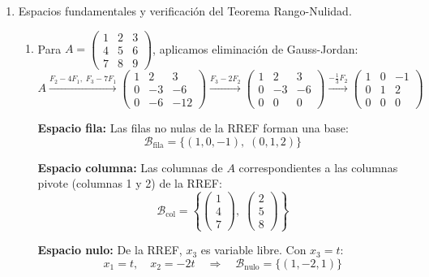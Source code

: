 \documentclass[12pt,letterpaper]{article}
\begin{document}
\begin{enumerate}


\item Espacios fundamentales y verificación del Teorema Rango-Nulidad.

\begin{enumerate}

    \item Para $A = \begin{pmatrix} 1 & 2 & 3 \\ 4 & 5 & 6 \\ 7 & 8 & 9 \end{pmatrix}$, aplicamos eliminación de Gauss-Jordan:
    \[
    A \xrightarrow{F_2-4F_1,\; F_3-7F_1}
    \begin{pmatrix} 1 & 2 & 3 \\ 0 & -3 & -6 \\ 0 & -6 & -12 \end{pmatrix}
    \xrightarrow{F_3-2F_2}
    \begin{pmatrix} 1 & 2 & 3 \\ 0 & -3 & -6 \\ 0 & 0 & 0 \end{pmatrix}
    \xrightarrow{-\frac{1}{3}F_2}
    \begin{pmatrix} 1 & 0 & -1 \\ 0 & 1 & 2 \\ 0 & 0 & 0 \end{pmatrix}
    \]

    \textbf{Espacio fila:} Las filas no nulas de la RREF forman una base:
    \[
    \mathcal{B}_{\text{fila}} = \{(1,0,-1),\; (0,1,2)\}
    \]

    \textbf{Espacio columna:} Las columnas de $A$ correspondientes a las columnas pivote (columnas 1 y 2) de la RREF:
    \[
    \mathcal{B}_{\text{col}} = \left\{\begin{pmatrix}1\\4\\7\end{pmatrix},\; \begin{pmatrix}2\\5\\8\end{pmatrix}\right\}
    \]

    \textbf{Espacio nulo:} De la RREF, $x_3$ es variable libre. Con $x_3 = t$:
    \[
    x_1 = t, \quad x_2 = -2t \quad \Rightarrow \quad \mathcal{B}_{\text{nulo}} = \{(1,-2,1)\}
    \]


\end{enumerate}
\end{enumerate}
\end{document}
